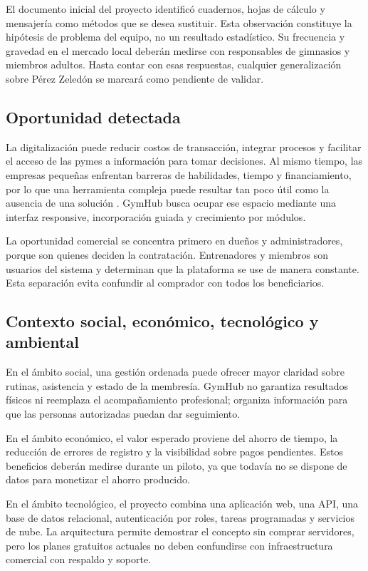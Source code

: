 El documento inicial del proyecto identificó cuadernos, hojas de cálculo y
mensajería como métodos que se desea sustituir. Esta observación constituye la
hipótesis de problema del equipo, no un resultado estadístico. Su frecuencia y
gravedad en el mercado local deberán medirse con responsables de gimnasios y
miembros adultos. Hasta contar con esas respuestas, cualquier generalización
sobre Pérez Zeledón se marcará como pendiente de validar.

\subsection{Oportunidad detectada}

La digitalización puede reducir costos de transacción, integrar procesos y
facilitar el acceso de las pymes a información para tomar decisiones. Al mismo
tiempo, las empresas pequeñas enfrentan barreras de habilidades, tiempo y
financiamiento, por lo que una herramienta compleja puede resultar tan poco útil
como la ausencia de una solución \parencite{oecd2021}. GymHub busca ocupar ese
espacio mediante una interfaz responsive, incorporación guiada y crecimiento
por módulos.

La oportunidad comercial se concentra primero en dueños y administradores,
porque son quienes deciden la contratación. Entrenadores y miembros son usuarios
del sistema y determinan que la plataforma se use de manera constante. Esta
separación evita confundir al comprador con todos los beneficiarios.

\subsection{Contexto social, económico, tecnológico y ambiental}

En el ámbito social, una gestión ordenada puede ofrecer mayor claridad sobre
rutinas, asistencia y estado de la membresía. GymHub no garantiza resultados
físicos ni reemplaza el acompañamiento profesional; organiza información para
que las personas autorizadas puedan dar seguimiento.

En el ámbito económico, el valor esperado proviene del ahorro de tiempo, la
reducción de errores de registro y la visibilidad sobre pagos pendientes. Estos
beneficios deberán medirse durante un piloto, ya que todavía no se dispone de
datos para monetizar el ahorro producido.

En el ámbito tecnológico, el proyecto combina una aplicación web, una API, una
base de datos relacional, autenticación por roles, tareas programadas y servicios
de nube. La arquitectura permite demostrar el concepto sin comprar servidores,
pero los planes gratuitos actuales no deben confundirse con infraestructura
comercial con respaldo y soporte.

